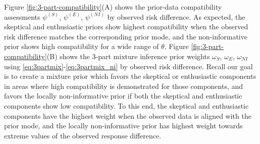 \documentclass[useAMS,usenatbib,referee]{biom}
\begin{document}
Figure \ref{fig:3-part-compatibility}(A) shows the prior-data compatibility assessments $\psi^{(S)}$, $\psi^{(E)}$, $\psi^{(NI)}$ by observed risk difference. As expected, the skeptical and enthusiastic priors show highest compatibility when the observed risk difference matches the corresponding prior mode, and the non-informative prior shows high compatibility for a wide range of $\theta$. Figure \ref{fig:3-part-compatibility}(B) shows the 3-part mixture inference prior weights $\omega_S$, $\omega_{E}$, $\omega_{NI}$ using \eqref{eq:3partmix}-\eqref{eq:3partmix_ni} by observed risk difference. Recall our goal is to create a mixture prior which favors the skeptical or enthusiastic components in areas where high compatibility is demonstrated for those components, and favors the locally non-informative prior if both the skeptical and enthusiastic components show low compatibility. To this end, the skeptical and enthusiastic components have the highest weight when the observed data is aligned with the prior mode, and the locally non-informative prior has highest weight towards extreme values of the observed response difference.
\end{document}
